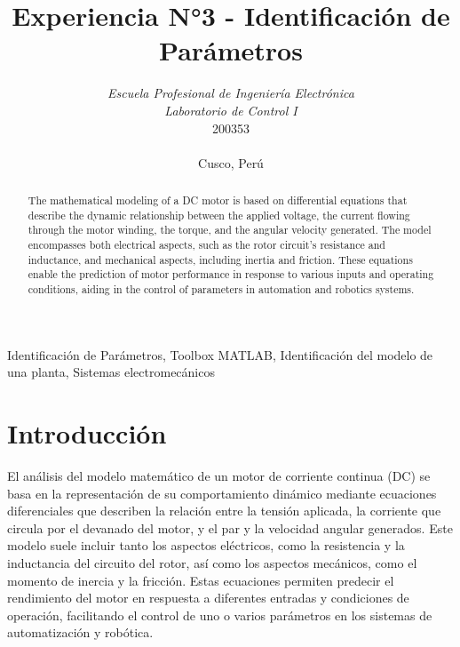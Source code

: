 \documentclass[conference]{IEEEtran}
\begin{document}
	
	\title{Experiencia N°3 - Identificación de Parámetros}
	\author{	
		\textit{Escuela Profesional de Ingeniería Electrónica}\\
		\textit{Laboratorio de Control I}\\
		200353 \\\\
		Cusco, Perú
	}
	
	\maketitle
	
	\begin{abstract}
		The mathematical modeling of a DC motor is based on differential equations that describe the dynamic relationship between the applied voltage, the current flowing through the motor winding, the torque, and the angular velocity generated. The model encompasses both electrical aspects, such as the rotor circuit's resistance and inductance, and mechanical aspects, including inertia and friction. These equations enable the prediction of motor performance in response to various inputs and operating conditions, aiding in the control of parameters in automation and robotics systems.
	\end{abstract}
	
	\begin{IEEEkeywords}
		Identificación de Parámetros, Toolbox MATLAB, Identificación del modelo de una planta, Sistemas electromecánicos
	\end{IEEEkeywords}
	
	\section{Introducción}
		El análisis del modelo matemático de un motor de corriente continua (DC) se basa en la representación de su comportamiento dinámico mediante ecuaciones diferenciales que describen la relación entre la tensión aplicada, la corriente que circula por el devanado del motor, y el par y la velocidad angular generados. Este modelo suele incluir tanto los aspectos eléctricos, como la resistencia y la inductancia del circuito del rotor, así como los aspectos mecánicos, como el momento de inercia y la fricción. Estas ecuaciones permiten predecir el rendimiento del motor en respuesta a diferentes entradas y condiciones de operación, facilitando el control de uno o varios parámetros en los sistemas de automatización y robótica.
\end{document}

